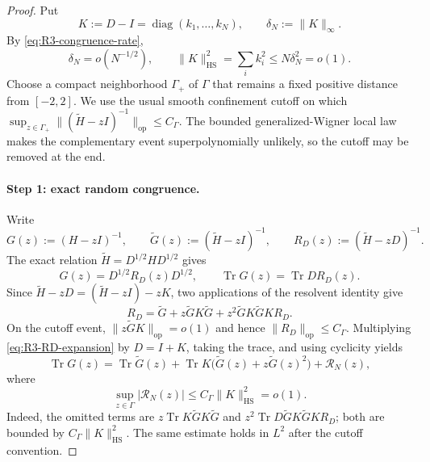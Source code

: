 \documentclass[10pt,a4paper]{amsart}
\newcommand{\Tr}{\operatorname{Tr}}
\newcommand{\diag}{\operatorname{diag}}
\newcommand{\op}{\mathrm{op}}
\newcommand{\HS}{\mathrm{HS}}
\newcommand{\norm}[1]{\lVert #1\rVert}
\begin{document}
\begin{proof}
Put
\begin{equation}\label{eq:R3-K-definition}
 K:=D-I=\diag(k_1,\ldots,k_N),
 \qquad \delta_N:=\norm{K}_\infty.
\end{equation}
By \eqref{eq:R3-congruence-rate},
\begin{equation}\label{eq:R3-K-rates}
 \delta_N=o(N^{-1/2}),
 \qquad
 \norm{K}_{\HS}^2=\sum_i k_i^2\le N\delta_N^2=o(1).
\end{equation}
Choose a compact neighborhood \(\Gamma_+\) of \(\Gamma\) that remains a
fixed positive distance from \([-2,2]\).  We use the usual smooth confinement
cutoff on which
\(\sup_{z\in\Gamma_+}\norm{(\widetilde H-zI)^{-1}}_{\op}\le C_\Gamma\).
The bounded generalized-Wigner local law makes the complementary event
superpolynomially unlikely, so the cutoff may be removed at the end.

\paragraph{Step 1: exact random congruence.}
Write
\[
 G(z):=(H-zI)^{-1},\qquad
 \widetilde G(z):=(\widetilde H-zI)^{-1},\qquad
 R_D(z):=(\widetilde H-zD)^{-1}.
\]
The exact relation \(\widetilde H=D^{1/2}HD^{1/2}\) gives
\begin{equation}\label{eq:R3-exact-congruence}
 G(z)=D^{1/2}R_D(z)D^{1/2},
 \qquad \Tr G(z)=\Tr DR_D(z).
\end{equation}
Since \(\widetilde H-zD=(\widetilde H-zI)-zK\), two applications of the
resolvent identity give
\begin{equation}\label{eq:R3-RD-expansion}
 R_D=\widetilde G+z\widetilde G K\widetilde G
 +z^2\widetilde G K\widetilde G K R_D.
\end{equation}
On the cutoff event, \(\norm{z\widetilde G K}_{\op}=o(1)\) and hence
\(\norm{R_D}_{\op}\le C_\Gamma\).  Multiplying
\eqref{eq:R3-RD-expansion} by \(D=I+K\), taking the trace, and using cyclicity
yields
\begin{equation}\label{eq:R3-random-congruence-expansion}
 \Tr G(z)=\Tr\widetilde G(z)
 +\Tr K\bigl(\widetilde G(z)+z\widetilde G(z)^2\bigr)
 +\mathcal R_N(z),
\end{equation}
where
\begin{equation}\label{eq:R3-random-congruence-rem}
 \sup_{z\in\Gamma}|\mathcal R_N(z)|
 \le C_\Gamma\norm{K}_{\HS}^2=o(1).
\end{equation}
Indeed, the omitted terms are
\(z\Tr K\widetilde G K\widetilde G\) and
\(z^2\Tr D\widetilde G K\widetilde G K R_D\); both are bounded by
\(C_\Gamma\norm{K}_{\HS}^2\).  The same estimate holds in \(L^2\) after the
cutoff convention.


\end{proof}
\end{document}
